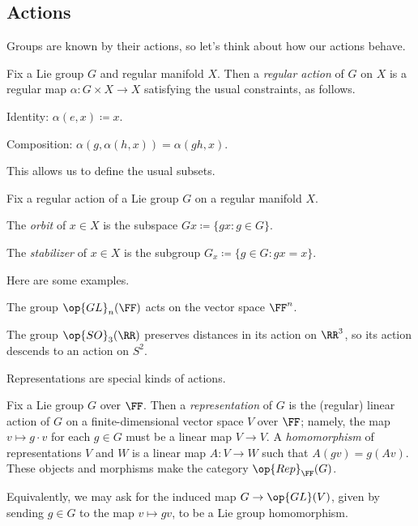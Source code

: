 \documentclass[../notes.tex]{subfiles}
\begin{document}
\subsection{Actions}
Groups are known by their actions, so let's think about how our actions behave.
\begin{definition}[action]
	Fix a Lie group $G$ and regular manifold $X$. Then a \textit{regular action} of $G$ on $X$ is a regular map $\alpha\colon G\times X\to X$ satisfying the usual constraints, as follows.
	\begin{listalph}
		\item Identity: $\alpha(e,x)\coloneqq x$.
		\item Composition: $\alpha(g,\alpha(h,x))=\alpha(gh,x)$.
	\end{listalph}
\end{definition}
This allows us to define the usual subsets.
\begin{defihelper}  
	Fix a regular action of a Lie group $G$ on a regular manifold $X$.
	\begin{listalph}
		\item The \textit{orbit} of $x\in X$ is the subspace $Gx\coloneqq\{gx:g\in G\}$.
		\item The \textit{stabilizer} of $x\in X$ is the subgroup $G_x\coloneqq\{g\in G:gx=x\}$.
	\end{listalph}
\end{defihelper}
Here are some examples.
\begin{example}
	The group $\op{GL}_n(\FF)$ acts on the vector space $\FF^n$.
\end{example}
\begin{example}
	The group $\op{SO}_3(\RR)$ preserves distances in its action on $\RR^3$, so its action descends to an action on $S^2$.
\end{example}
Representations are special kinds of actions.
\begin{definition}[representation]
	Fix a Lie group $G$ over $\FF$. Then a \textit{representation} of $G$ is the (regular) linear action of $G$ on a finite-dimensional vector space $V$ over $\FF$; namely, the map $v\mapsto g\cdot v$ for each $g\in G$ must be a linear map $V\to V$. A \textit{homomorphism} of representations $V$ and $W$ is a linear map $A\colon V\to W$ such that $A(gv)=g(Av)$. These objects and morphisms make the category $\op{Rep}_{\FF}(G)$.
\end{definition}
\begin{remark}
	Equivalently, we may ask for the induced map $G\to\op{GL}(V)$, given by sending $g\in G$ to the map $v\mapsto gv$, to be a Lie group homomorphism.
\end{remark}
\end{document}
